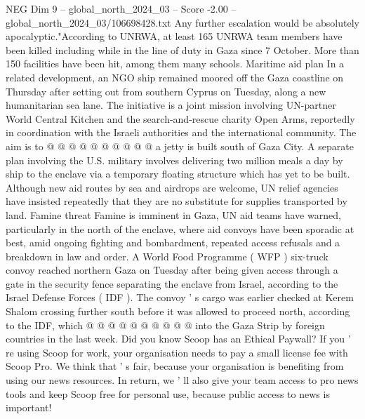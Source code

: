 \begin{textsample}{NEG Dim 9 – global\_north\_2024\_03 – Score -2.00 – global\_north\_2024\_03/106698428.txt}
Any further escalation would be absolutely apocalyptic."According to UNRWA, at least 165 UNRWA team members have been killed including while in the line of duty in Gaza since 7 October.
More than 150 facilities have been hit, among them many schools.
Maritime aid plan In a related development, an NGO ship remained moored off the Gaza coastline on Thursday after setting out from southern Cyprus on Tuesday, along a new humanitarian sea lane.
The initiative is a joint mission involving UN-partner World Central Kitchen and the search-and-rescue charity Open Arms, reportedly in coordination with the Israeli authorities and the international community.
The aim is to @ @ @ @ @ @ @ @ @ @ a jetty is built south of Gaza City.
A separate plan involving the U.S. military involves delivering two million meals a day by ship to the enclave via a temporary floating structure which has yet to be built.
Although new aid routes by sea and airdrops are welcome, UN relief agencies have insisted repeatedly that they are no substitute for supplies transported by land.
Famine threat Famine is imminent in Gaza, UN aid teams have warned, particularly in the north of the enclave, where aid convoys have been sporadic at best, amid ongoing fighting and bombardment, repeated access refusals and a breakdown in law and order.
A World Food Programme ( WFP ) six-truck convoy reached northern Gaza on Tuesday after being given access through a gate in the security fence separating the enclave from Israel, according to the Israel Defense Forces ( IDF ).
The convoy ' s cargo was earlier checked at Kerem Shalom crossing further south before it was allowed to proceed north, according to the IDF, which @ @ @ @ @ @ @ @ @ @ into the Gaza Strip by foreign countries in the last week.
Did you know Scoop has an Ethical Paywall?
If you ' re using Scoop for work, your organisation needs to pay a small license fee with Scoop Pro.
We think that ' s fair, because your organisation is benefiting from using our news resources.
In return, we ' ll also give your team access to pro news tools and keep Scoop free for personal use, because public access to news is important!

\end{textsample}
